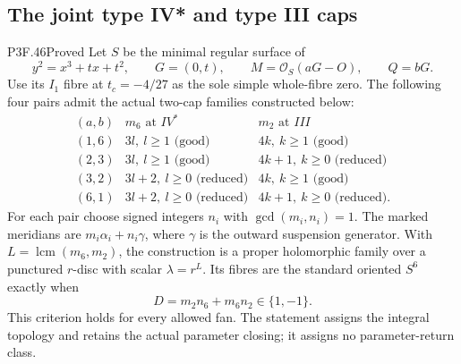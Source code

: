 \subsection{The joint type IV* and type III caps}

\begin{statement}{P3F.46}{Proved}
Let $S$ be the minimal regular surface of
\[
 y^2=x^3+tx+t^2,\qquad G=(0,t),\qquad
 M=\mathcal O_S(aG-O),\qquad Q=bG.
\]
Use its $I_1$ fibre at $t_c=-4/27$ as the sole simple whole-fibre
zero. The following four pairs admit the actual two-cap families
constructed below:
\[
\begin{array}{c|c|c}
(a,b)&m_6\text{ at }IV^*&m_2\text{ at }III\\ \hline
(1,6)&3l,\ l\ge1\text{ (good)}&4k,\ k\ge1\text{ (good)}\\
(2,3)&3l,\ l\ge1\text{ (good)}&4k+1,\ k\ge0\text{ (reduced)}\\
(3,2)&3l+2,\ l\ge0\text{ (reduced)}&4k,\ k\ge1\text{ (good)}\\
(6,1)&3l+2,\ l\ge0\text{ (reduced)}&4k+1,\ k\ge0\text{ (reduced)}.
\end{array}                                                     \tag{F46.1}
\]
For each pair choose signed integers $n_i$ with
$\gcd(m_i,n_i)=1$. The marked meridians are
$m_i\alpha_i+n_i\gamma$, where $\gamma$ is the outward
suspension generator. With $L=\operatorname{lcm}(m_6,m_2)$,
the construction is a proper holomorphic family over a punctured
$r$-disc with scalar $\lambda=r^L$. Its fibres are the standard
oriented $S^6$ exactly when
\[
                  D=m_2n_6+m_6n_2\in\{1,-1\}.                 \tag{F46.2}
\]
This criterion holds for every allowed fan. The statement assigns
the integral topology and retains the actual parameter closing;
it assigns no parameter-return class.
\end{statement}
